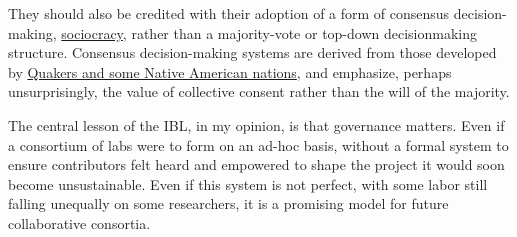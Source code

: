 \documentclass[notoc]{tufte-book}
\begin{document}
They should also be credited with their adoption of a form of consensus
decision-making, \href{https://sociocracy.info}{sociocracy}, rather than
a majority-vote or top-down decisionmaking structure. Consensus
decision-making systems are derived from those developed by
\href{https://rhizomenetwork.wordpress.com/2011/06/18/a-brief-history-of-consenus-decision-making/}{Quakers
and some Native American nations}, and emphasize, perhaps
unsurprisingly, the value of collective consent rather than the will of
the majority.

The central lesson of the IBL, in my opinion, is that governance
matters. Even if a consortium of labs were to form on an ad-hoc basis,
without a formal system to ensure contributors felt heard and empowered
to shape the project it would soon become unsustainable. Even if this
system is not perfect, with some labor still falling unequally on some
researchers, it is a promising model for future collaborative consortia.
\end{document}
